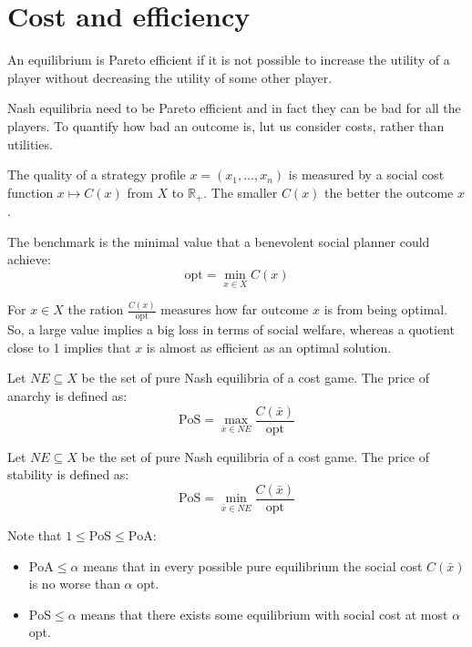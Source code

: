 \section{Cost and efficiency}

\begin{definition}
    An equilibrium is Pareto efficient if it is not possible to increase the utility of a player without decreasing the utility of some other player. 
\end{definition}
\noindent Nash equilibria need to be Pareto efficient and in fact they can be bad for all the players. 
To quantify how bad an outcome is, lut us consider costs, rather than utilities. 

The quality of a strategy profile $x=(x_1,\dots,x_n)$ is measured by a social cost function $x\mapsto C(x)$ from $X$ to $\mathbb{R}_{+}$.
The smaller $C(x)$ the better the outcome $x$. 
\begin{definition}
    The benchmark is the minimal value that a benevolent social planner could achieve: 
    \[\text{opt}=\min_{x\in X}C(x)\]
\end{definition}
\noindent For $x\in X$ the ration $\frac{C(x)}{\text{opt}}$ measures how far outcome $x$ is from being optimal. 
So, a large value implies a big loss in terms of social welfare, whereas a quotient close to 1 implies that $x$ is almost as efficient as an optimal solution. 

\begin{definition}
    Let $NE\subseteq X$ be the set of pure Nash equilibria of a cost game. 
    The price of anarchy is defined as: 
    \[\text{PoS}=\max_{\bar{x}\in NE}\dfrac{C(\bar{x})}{\text{opt}}\]
\end{definition}
\begin{definition}
    Let $NE\subseteq X$ be the set of pure Nash equilibria of a cost game. 
    The price of stability is defined as: 
    \[\text{PoS}=\min_{\bar{x}\in NE}\dfrac{C(\bar{x})}{\text{opt}}\]
\end{definition}
Note that $1\leq\text{PoS}\leq\text{PoA}$: 
\begin{itemize}
    \item $\text{PoA}\leq\alpha$ means that in every possible pure equilibrium the social cost $C(\bar{x})$ is no worse than $\alpha$ opt. 
    \item $\text{PoS}\leq\alpha$ means that there exists some equilibrium with social cost at most $\alpha$ opt. 
\end{itemize}

